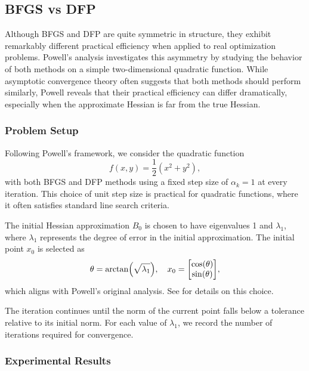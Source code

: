 \documentclass[0_en]{subfiles}
\begin{document}
\subsection{BFGS vs DFP}

Although BFGS and DFP are quite symmetric in structure, they exhibit remarkably different practical efficiency when applied to real optimization problems. Powell's analysis \citep{powellHowBadAre1986} investigates this asymmetry by studying the behavior of both methods on a simple two-dimensional quadratic function. While asymptotic convergence theory often suggests that both methods should perform similarly, Powell reveals that their practical efficiency can differ dramatically, especially when the approximate Hessian is far from the true Hessian.

\subsubsection{Problem Setup}

Following Powell's framework, we consider the quadratic function
\begin{equation}
    f(x, y) = \frac{1}{2}(x^2 + y^2),
\end{equation}
with both BFGS and DFP methods using a fixed step size of $\alpha_k = 1$ at every iteration. This choice of unit step size is practical for quadratic functions, where it often satisfies standard line search criteria.

The initial Hessian approximation $B_0$ is chosen to have eigenvalues 1 and $\lambda_1$, where $\lambda_1$ represents the degree of error in the initial approximation.
The initial point $x_0$ is selected as
\begin{equation}
    \theta = \arctan(\sqrt{\lambda_1}), \quad x_0 = \mqty[\cos(\theta) \\ \sin(\theta)],
\end{equation}
which aligns with Powell's original analysis.
See \citep{powellHowBadAre1986} for details on this choice.

The iteration continues until the norm of the current point falls below a tolerance relative to its initial norm. For each value of $\lambda_1$, we record the number of iterations required for convergence.

\subsubsection{Experimental Results}
\end{document}
